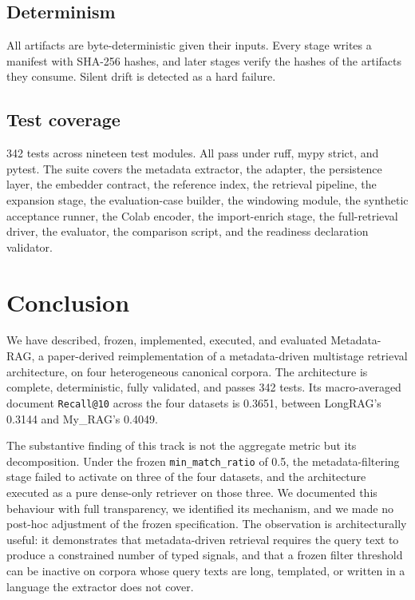 \documentclass[11pt,a4paper]{article}
\begin{document}
\subsection{Determinism}
All artifacts are byte-deterministic given their inputs. Every stage
writes a manifest with SHA-256 hashes, and later stages verify the
hashes of the artifacts they consume. Silent drift is detected as a
hard failure.

\subsection{Test coverage}
\num{342} tests across nineteen test modules. All pass under ruff,
mypy strict, and pytest. The suite covers the metadata extractor,
the adapter, the persistence layer, the embedder contract, the
reference index, the retrieval pipeline, the expansion stage, the
evaluation-case builder, the windowing module, the synthetic
acceptance runner, the Colab encoder, the import-enrich stage, the
full-retrieval driver, the evaluator, the comparison script, and the
readiness declaration validator.

\section{Conclusion}\label{sec:conclusion}

We have described, frozen, implemented, executed, and evaluated
Metadata-RAG, a paper-derived reimplementation of a
metadata-driven multistage retrieval architecture, on four
heterogeneous canonical corpora. The architecture is complete,
deterministic, fully validated, and passes \num{342} tests. Its
macro-averaged document \texttt{Recall@10} across the four datasets
is \num{0.3651}, between LongRAG's \num{0.3144} and My\_RAG's
\num{0.4049}.

The substantive finding of this track is not the aggregate metric but
its decomposition. Under the frozen \texttt{min\_match\_ratio} of
\num{0.5}, the metadata-filtering stage failed to activate on three
of the four datasets, and the architecture executed as a pure
dense-only retriever on those three. We documented this behaviour
with full transparency, we identified its mechanism, and we made no
post-hoc adjustment of the frozen specification. The observation is
architecturally useful: it demonstrates that metadata-driven
retrieval requires the query text to produce a constrained number of
typed signals, and that a frozen filter threshold can be inactive on
corpora whose query texts are long, templated, or written in a
language the extractor does not cover.
\end{document}
